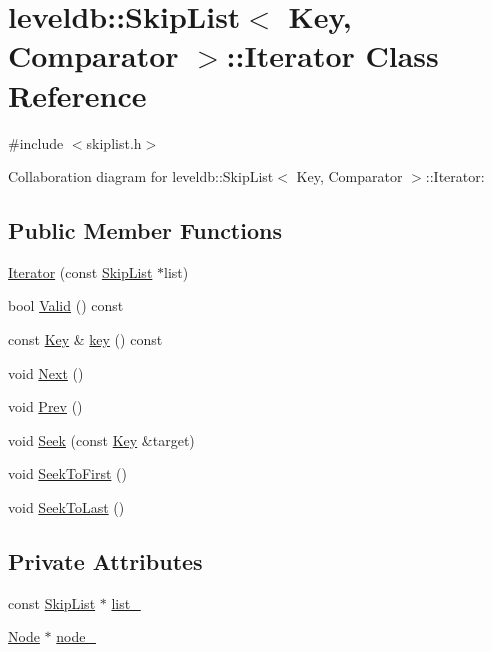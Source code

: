 \hypertarget{classleveldb_1_1_skip_list_1_1_iterator}{\section{leveldb\-:\-:Skip\-List$<$ Key, Comparator $>$\-:\-:Iterator Class Reference}
\label{classleveldb_1_1_skip_list_1_1_iterator}
}


{\ttfamily \#include $<$skiplist.\-h$>$}



Collaboration diagram for leveldb\-:\-:Skip\-List$<$ Key, Comparator $>$\-:\-:Iterator\-:
\subsection*{Public Member Functions}
\begin{DoxyCompactItemize}
\item 
\hyperlink{classleveldb_1_1_skip_list_1_1_iterator_ab27d6dd0959d67ed26f2bd451c18270c}{Iterator} (const \hyperlink{classleveldb_1_1_skip_list}{Skip\-List} $\ast$list)
\item 
bool \hyperlink{classleveldb_1_1_skip_list_1_1_iterator_ac074827b7e9ded32283385e6228ef8cd}{Valid} () const 
\item 
const \hyperlink{namespaceleveldb_a7e9a9725b13fa0bd922d885280dfab95}{Key} \& \hyperlink{classleveldb_1_1_skip_list_1_1_iterator_a5d2a82038f440d557b32afb398c7eb57}{key} () const 
\item 
void \hyperlink{classleveldb_1_1_skip_list_1_1_iterator_ade5a684c74056f578f85237735da0cef}{Next} ()
\item 
void \hyperlink{classleveldb_1_1_skip_list_1_1_iterator_a10dbaf45640ab2b9f61a96c82e7227e5}{Prev} ()
\item 
void \hyperlink{classleveldb_1_1_skip_list_1_1_iterator_a6c641d5cd37386abdb0aa8d73454611a}{Seek} (const \hyperlink{namespaceleveldb_a7e9a9725b13fa0bd922d885280dfab95}{Key} \&target)
\item 
void \hyperlink{classleveldb_1_1_skip_list_1_1_iterator_adf69c04f0480a66f10a125c49e19caa7}{Seek\-To\-First} ()
\item 
void \hyperlink{classleveldb_1_1_skip_list_1_1_iterator_afe892ff436137b85216c2ed124f3c6dd}{Seek\-To\-Last} ()
\end{DoxyCompactItemize}
\subsection*{Private Attributes}
\begin{DoxyCompactItemize}
\item 
const \hyperlink{classleveldb_1_1_skip_list}{Skip\-List} $\ast$ \hyperlink{classleveldb_1_1_skip_list_1_1_iterator_a975880d27195f53ff0d0e599543b4aba}{list\-\_\-}
\item 
\hyperlink{structleveldb_1_1_skip_list_1_1_node}{Node} $\ast$ \hyperlink{classleveldb_1_1_skip_list_1_1_iterator_aca4dad33d2cb4c9ea3a16f2d5f164a42}{node\-\_\-}
\end{DoxyCompactItemize}


